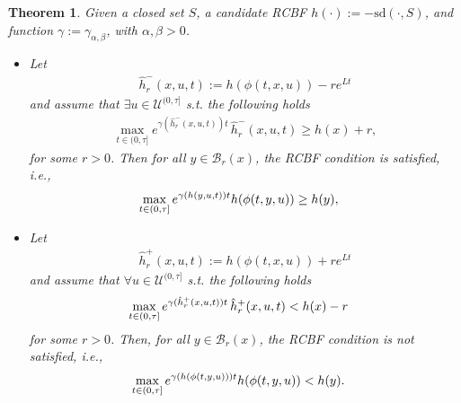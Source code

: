 \documentclass[letterpaper, 10 pt, conference]{ieeeconf}
\newtheorem{theorem}{Theorem}
\newcommand{\y}{y}
\newcommand{\U}{\mathcal{U}}
\begin{document}
\begin{theorem}
Given a closed set $S$, a candidate RCBF $h(\cdot) := - \mathrm{sd}(\cdot, S)$, and function $\gamma:=\gamma_{\alpha,\beta}$, with $\alpha,\beta>0$.
\begin{itemize}
    \item[(i)] Let 
        \begin{align}
            \hat{h}_{r}^{-}(x,u,t) := h(\phi(t, x, u)) - re^{Lt}           
        \end{align}
    and assume that $\exists u\in\U^{(0,\tau]}$ s.t. the following holds
    \begin{align}
        \max\limits_{ t \in (0,\tau]} e^{\gamma(\hat h_r^-(x,u,t)) t}\, \hat{h}_{r}^{-}(x, u, t)\geq h(x) + r,
        \label{eq:robu_recur}
    \end{align}
    for some $r>0$. Then for all $y \in \mathcal{B}_{r}(x)$, the RCBF condition is satisfied, i.e.,
    \begin{align}
    \hspace{-1em}
        \max\limits_{t \in (0,\tau]} 
        e^{\gamma(h(y, u, t)) t} h(\phi(t, y, u))
        \geq h(y), 
        \label{eq:robu_recur_con}
    \end{align}
    \item[(ii)] Let 
    \begin{align}
         \hat{h}_{r}^{+}(x,u,t) := h(\phi(t, x, u)) + re^{Lt}
    \end{align}
    and assume that $\forall u\in\U^{(0,\tau]}$ s.t. the following holds
    \begin{align}
    \hspace{-1em}
        \max\limits_{ t \in (0,\tau]} e^{\gamma(\hat h_r^+(x,u,t)) t}\, \hat{h}_{r}^{+}(x, u, t)< h(x) - r
        \label{eq:robu_unrecur}
    \end{align}
    for some $r > 0$. Then, for all $y \in \mathcal{B}_{r}(x)$, the RCBF condition is not satisfied, i.e.,  
    \begin{align}
    \hspace{-1em}
        \max_{t \in (0, \tau]} 
        e^{\gamma(h(\phi(t,y,u))) t} h(\phi(t, y, u))
        < h(y).
        \label{eq:robu_unrecur_con}
    \end{align}
\end{itemize}
\label{theo:RCBF_Approximation}
\end{theorem}
\end{document}
